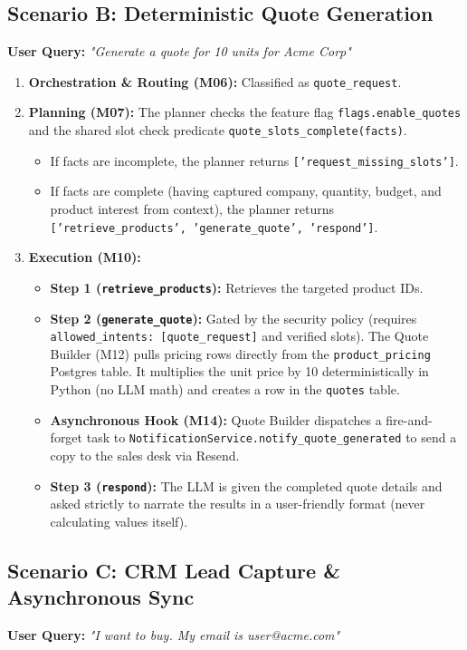 \documentclass[11pt,a4paper]{article}
\begin{document}
\subsection{Scenario B: Deterministic Quote Generation}
\textbf{User Query:} \textit{"Generate a quote for 10 units for Acme Corp"}

\begin{enumerate}
    \item \textbf{Orchestration \& Routing (M06):} Classified as \texttt{quote_request}.
    \item \textbf{Planning (M07):} The planner checks the feature flag \texttt{flags.enable_quotes} and the shared slot check predicate \texttt{quote_slots_complete(facts)}. 
    \begin{itemize}
        \item If facts are incomplete, the planner returns \texttt{['request_missing_slots']}.
        \item If facts are complete (having captured company, quantity, budget, and product interest from context), the planner returns \texttt{['retrieve_products', 'generate_quote', 'respond']}.
    \end{itemize}
    \item \textbf{Execution (M10):}
    \begin{itemize}
        \item \textbf{Step 1 (\texttt{retrieve_products}):} Retrieves the targeted product IDs.
        \item \textbf{Step 2 (\texttt{generate_quote}):} Gated by the security policy (requires \texttt{allowed_intents: [quote_request]} and verified slots). The Quote Builder (M12) pulls pricing rows directly from the \texttt{product_pricing} Postgres table. It multiplies the unit price by 10 deterministically in Python (no LLM math) and creates a row in the \texttt{quotes} table. 
        \item \textbf{Asynchronous Hook (M14):} Quote Builder dispatches a fire-and-forget task to \texttt{NotificationService.notify_quote_generated} to send a copy to the sales desk via Resend.
        \item \textbf{Step 3 (\texttt{respond}):} The LLM is given the completed quote details and asked strictly to narrate the results in a user-friendly format (never calculating values itself).
    \end{itemize}
\end{enumerate}

\subsection{Scenario C: CRM Lead Capture \& Asynchronous Sync}
\textbf{User Query:} \textit{"I want to buy. My email is user@acme.com"}
\end{document}
